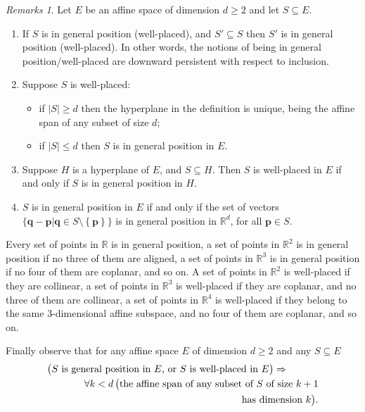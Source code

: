 \documentclass[12pt]{amsart}
\newcommand{\FORALL}[1]{\forall {#1} \, }
\newcommand{\R}{\mathbb{R}}	%
\newcommand{\IMPLIES}{\Rightarrow }
\newcommand{\Mid}{\boldsymbol\mid}			%
\newcommand{\setof}[2]{\mathopen \{{#1}\Mid{#2} \mathclose\}} %
\newcommand{\setLR}[1]{\left \{ {#1} \right \}} %
\newcommand{\card}[1]{\mathopen | #1 \mathclose |}		%
\theoremstyle{plain}
\theoremstyle{definition}
\theoremstyle{remark}
\newtheorem{remarks}[theorem]{Remarks}
\begin{document}
\begin{remarks}\label{rmks:well-placed}
Let \( E \) be an affine space of dimension \( d \geq 2 \) and let \( S \subseteq E \).
\begin{enumerate}[label={\upshape (\alph*)}]
\item\label{rmks:well-placed-a}
If \( S \) is in general position (well-placed), and \( S' \subseteq S \) then \( S' \) is in general position (well-placed).
In other words, the notions of being in general position/well-placed are downward persistent with respect to inclusion.
\item
Suppose \( S \) is well-placed: 
\begin{itemize}
\item
if \( \card{S} \geq d \) then the hyperplane in the definition is unique, being the affine span of any subset of size \( d \);
\item
if \( \card{S} \leq d \) then \( S \) is in general position in \( E \).
\end{itemize}
\item
Suppose \( H \) is a hyperplane of \( E \), and \( S \subseteq H \).
Then \( S \) is well-placed in \( E \) if and only if \( S \) is in general position in \( H \).
\item
\( S \) is in general position in \( E \) if and only if the set of vectors \( \setof{ \mathbf{q} - \mathbf{p} }{ \mathbf{q} \in S \setminus \setLR{\mathbf{p} } } \) is in general position in \( \R^d \), for all \( \mathbf{p} \in S \).
\end{enumerate}
\end{remarks}

Every set of points in \( \R \) is in general position, a set of points in \( \R^2 \) is in general position if no three of them are aligned, a set of points in \( \R^3 \) is in general position if no four of them are coplanar, and so on. 
A set of points in \( \R^2 \) is well-placed if they are collinear, a set of points in \( \R^3 \) is well-placed if they are coplanar, and no three of them are collinear, a set of points in \( \R^4 \) is well-placed if they belong to the same \( 3 \)-dimensional affine subspace, and no four of them are coplanar, and so on.

Finally observe that for any affine space \( E \) of dimension \( d \geq 2 \) and any \( S \subseteq E \)
\begin{equation}\label{eq:properlyplaced}
\begin{multlined}
 \bigl ( S \text{ is general position in \( E \), or \( S \) is well-placed in } E \bigr ) \IMPLIES {}\qquad
 \\
 \shoveright{\qquad\FORALL{ k < d}\bigl ( \text{the affine span of any subset of \( S \) of size } k + 1}
 \\
 \qquad\text{has dimension } k \bigr ) .
\end{multlined}
\end{equation}
\end{document}
